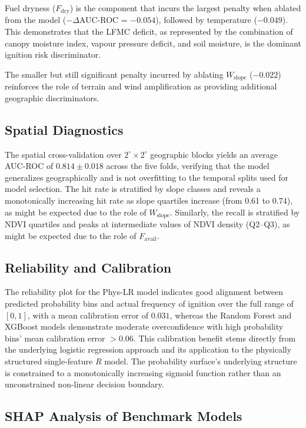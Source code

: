 \documentclass[conference]{IEEEtran}
\begin{document}
Fuel dryness ($F_{\mathrm{dry}}$) is the component that incurs the largest penalty when ablated from the model ($-\Delta$AUC-ROC = $-0.054$), followed by temperature ($-0.049$). This demonstrates that the LFMC deficit, as represented by the combination of canopy moisture index, vapour pressure deficit, and soil moisture, is the dominant ignition risk discriminator.

The smaller but still significant penalty incurred by ablating $W_{\mathrm{slope}}$ ($-0.022$) reinforces the role of terrain and wind amplification as providing additional geographic discriminators.

\subsection{Spatial Diagnostics}

The spatial cross-validation over $2^{\circ} \times 2^{\circ}$ geographic blocks yields an average AUC-ROC of $0.814 \pm 0.018$ across the five folds, verifying that the model generalizes geographically and is not overfitting to the temporal splits used for model selection.
The hit rate is stratified by slope classes and reveals a monotonically increasing hit rate as slope quartiles increase (from 0.61 to 0.74), as might be expected due to the role of $W_{\mathrm{slope}}$.
Similarly, the recall is stratified by NDVI quartiles and peaks at intermediate values of NDVI density (Q2--Q3), as might be expected due to the role of $F_{\mathrm{avail}}$.

\subsection{Reliability and Calibration}

The reliability plot for the Phys-LR model indicates good alignment between predicted probability bins and actual frequency of ignition over the full range of $[0, 1]$, with a mean calibration error of $0.031$, whereas the Random Forest and XGBoost models demonstrate moderate overconfidence with high probability bins' mean calibration error $> 0.06$. This calibration benefit stems directly from the underlying logistic regression approach and its application to the physically structured single-feature $R$ model. The probability surface's underlying structure is constrained to a monotonically increasing sigmoid function rather than an unconstrained non-linear decision boundary.

\subsection{SHAP Analysis of Benchmark Models}
\end{document}
